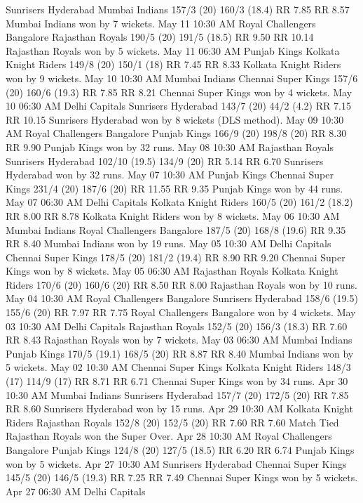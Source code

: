 Sunrisers Hyderabad
Mumbai Indians
157/3 (20)
160/3 (18.4)
RR 7.85
RR 8.57
Mumbai Indians won by 7 wickets.
May 11
10:30 AM
Royal Challengers Bangalore
Rajasthan Royals
190/5 (20)
191/5 (18.5)
RR 9.50
RR 10.14
Rajasthan Royals won by 5 wickets.
May 11
06:30 AM
Punjab Kings
Kolkata Knight Riders
149/8 (20)
150/1 (18)
RR 7.45
RR 8.33
Kolkata Knight Riders won by 9 wickets.
May 10
10:30 AM
Mumbai Indians
Chennai Super Kings
157/6 (20)
160/6 (19.3)
RR 7.85
RR 8.21
Chennai Super Kings won by 4 wickets.
May 10
06:30 AM
Delhi Capitals
Sunrisers Hyderabad
143/7 (20)
44/2 (4.2)
RR 7.15
RR 10.15
Sunrisers Hyderabad won by 8 wickets (DLS method).
May 09
10:30 AM
Royal Challengers Bangalore
Punjab Kings
166/9 (20)
198/8 (20)
RR 8.30
RR 9.90
Punjab Kings won by 32 runs.
May 08
10:30 AM
Rajasthan Royals
Sunrisers Hyderabad
102/10 (19.5)
134/9 (20)
RR 5.14
RR 6.70
Sunrisers Hyderabad won by 32 runs.
May 07
10:30 AM
Punjab Kings
Chennai Super Kings
231/4 (20)
187/6 (20)
RR 11.55
RR 9.35
Punjab Kings won by 44 runs.
May 07
06:30 AM
Delhi Capitals
Kolkata Knight Riders
160/5 (20)
161/2 (18.2)
RR 8.00
RR 8.78
Kolkata Knight Riders won by 8 wickets.
May 06
10:30 AM
Mumbai Indians
Royal Challengers Bangalore
187/5 (20)
168/8 (19.6)
RR 9.35
RR 8.40
Mumbai Indians won by 19 runs.
May 05
10:30 AM
Delhi Capitals
Chennai Super Kings
178/5 (20)
181/2 (19.4)
RR 8.90
RR 9.20
Chennai Super Kings won by 8 wickets.
May 05
06:30 AM
Rajasthan Royals
Kolkata Knight Riders
170/6 (20)
160/6 (20)
RR 8.50
RR 8.00
Rajasthan Royals won by 10 runs.
May 04
10:30 AM
Royal Challengers Bangalore
Sunrisers Hyderabad
158/6 (19.5)
155/6 (20)
RR 7.97
RR 7.75
Royal Challengers Bangalore won by 4 wickets.
May 03
10:30 AM
Delhi Capitals
Rajasthan Royals
152/5 (20)
156/3 (18.3)
RR 7.60
RR 8.43
Rajasthan Royals won by 7 wickets.
May 03
06:30 AM
Mumbai Indians
Punjab Kings
170/5 (19.1)
168/5 (20)
RR 8.87
RR 8.40
Mumbai Indians won by 5 wickets.
May 02
10:30 AM
Chennai Super Kings
Kolkata Knight Riders
148/3 (17)
114/9 (17)
RR 8.71
RR 6.71
Chennai Super Kings won by 34 runs.
Apr 30
10:30 AM
Mumbai Indians
Sunrisers Hyderabad
157/7 (20)
172/5 (20)
RR 7.85
RR 8.60
Sunrisers Hyderabad won by 15 runs.
Apr 29
10:30 AM
Kolkata Knight Riders
Rajasthan Royals
152/8 (20)
152/5 (20)
RR 7.60
RR 7.60
Match Tied Rajasthan Royals won the Super Over.
Apr 28
10:30 AM
Royal Challengers Bangalore
Punjab Kings
124/8 (20)
127/5 (18.5)
RR 6.20
RR 6.74
Punjab Kings won by 5 wickets.
Apr 27
10:30 AM
Sunrisers Hyderabad
Chennai Super Kings
145/5 (20)
146/5 (19.3)
RR 7.25
RR 7.49
Chennai Super Kings won by 5 wickets.
Apr 27
06:30 AM
Delhi Capitals
